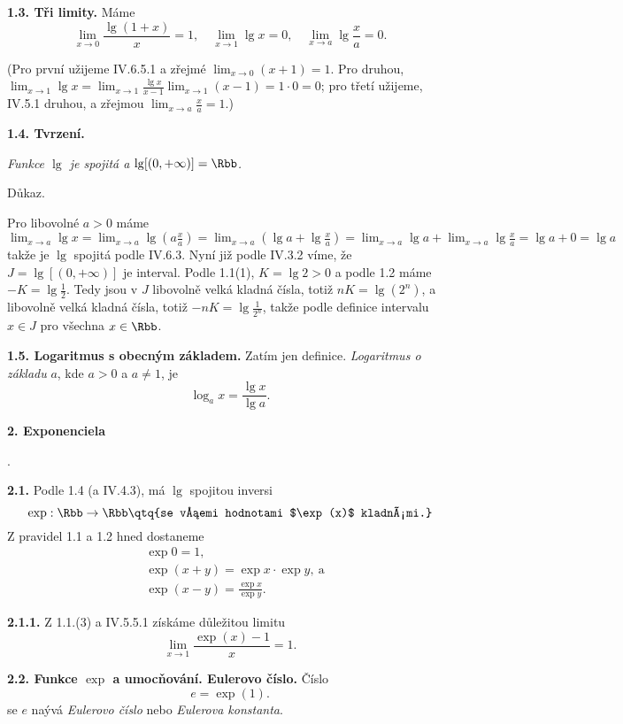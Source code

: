 \documentclass[12pt]{article}
\begin{document}
{ {\bf 1.3. Tři limity.} Máme
 $$
 \lim_{x\to 0}\frac{\lg(1+x)}{x}=1, \quad \lim_{x\to 1}\lg x=0,\quad
 \lim_{x\to a}\lg\frac{x}{a}=0.
 $$
 
 (Pro první užijeme IV.6.5.1 a zřejmé $\lim_{x\to 0}(x+1)=1$. Pro druhou, $\lim_{x\to 1}\lg x=\lim_{x\to 1}\frac{\lg x}{x-1}\lim_{x\to 1}(x-1)=1\cdot 0=0$; pro třetí užijeme, IV.5.1 druhou, a zřejmou $\lim_{x\to a}\frac{x}{a}=1$.)
 
 \bigskip
 
 {\bf 1.4. Tvrzení.} {\em Funkce $\lg$ je spojitá a $\lg[(0,+\infty)]=\Rbb$.
 
 Důkaz.} Pro libovolné $a>0$ máme $\lim_{x\to a}\lg x=
 \lim_{x\to a}\lg(a\frac{x}{a})=\lim_{x\to a}(\lg a+\lg\frac{x}{a})=
 \lim_{x\to a}\lg a+\lim_{x\to a}\lg\frac{x}{a}=\lg a +0=\lg a$ takže je $\lg$ spojitá podle IV.6.3.
 Nyní již podle IV.3.2 víme, že  $J=\lg[(0,+\infty)]$ je interval. Podle 1.1(1),
 $K=\lg 2>0$ a podle 1.2 máme $-K=\lg\frac12$. Tedy jsou v  $J$ libovolně velká kladná čísla, totiž $nK=\lg(2^n)$, a
 libovolně velká kladná čísla, totiž $-nK=\lg\frac{1}{2^n}$, tak\v ze podle 
  definice intervalu $x\in J$ pro všechna $x\in\Rbb$. \sq
 
 \bigskip
 
 {\bf 1.5. Logaritmus s obecným základem.} Zatím jen definice.  {\em Logaritmus o základu} $a$, kde  $a>0$ a $a\neq 1$, je
 $$
 \log_a x=\frac{\lg x}{\lg a}.
 $$
 
 \vskip10mm
 
 {\large\bf 2. Exponenciela}
 
 \bigskip.
 
 {\bf 2.1.}  Podle 1.4 (a IV.4.3), má $\lg$ spojitou inversi
 $$
 \exp:\Rbb\to\Rbb\qtq{se všemi hodnotami $\exp(x)$ kladnými.}
 $$
 Z pravidel 1.1 a 1.2 hned dostaneme
 $$
 \begin{aligned}
 &\exp 0=1,\\
 &\exp(x+y)=\exp x\cdot\exp y, \ \text{a}\\
 &\exp(x-y)=\frac{\exp x}{\exp y}.
 \end{aligned}
 $$
 
 \medskip
 
 {\bf 2.1.1.} Z 
 1.1.(3) a IV.5.5.1 získáme důležitou limitu
 $$
 \lim_{x\to 1}\frac{\exp(x)-1}{x}=1.
 $$
 
 \bigskip
 
 {\bf 2.2. Funkce $\exp$ a umocňování. Eulerovo číslo.} Číslo
 $$
 e=\exp(1).
 $$
se $e$ naývá {\em Eulerovo číslo} nebo {\em Eulerova konstanta}.
 
}
\end{document}
